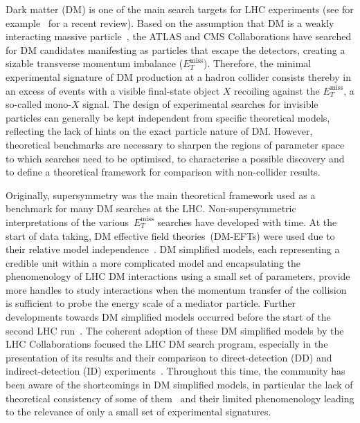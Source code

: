 \documentclass[a4paper, 11pt,notoc]{article}
\newcommand{\MET}{\ensuremath{E_T^\mathrm{miss}}\xspace}
\begin{document}
Dark matter (DM) is one of the main search targets for LHC experiments (see for example~\cite{Kahlhoefer:2017dnp} for a recent review). Based on the assumption that DM is a weakly interacting massive particle~\cite{Bertone:2004pz}, the ATLAS and CMS Collaborations have searched for DM candidates manifesting as particles that escape the detectors, creating a sizable transverse momentum imbalance ($\MET$). Therefore, the minimal experimental signature of DM production at a hadron collider consists thereby in an excess of events with a visible final-state object $X$ recoiling against the $\MET$, a so-called mono-$X$ signal.  The design of experimental searches for invisible particles can generally be kept independent from specific theoretical models, reflecting the lack of hints on the exact particle nature of DM. However, theoretical benchmarks are necessary to sharpen the regions of parameter space to which searches need to be optimised, to characterise a possible discovery and to define a theoretical framework for comparison with non-collider results. 

Originally, supersymmetry was the main theoretical framework used as a benchmark for many DM searches at the LHC.  Non-supersymmetric interpretations of the various~$\MET$ searches have  developed with time. At the start of data taking, DM effective field theories~(DM-EFTs)  were used due to their relative model independence~\cite{Cao:2009uw,Beltran:2010ww,Goodman:2010yf,Bai:2010hh,Goodman:2010ku,Fox:2011pm}.  DM simplified models, each representing a credible unit within a more complicated model and encapsulating the phenomenology of LHC DM interactions using a small set of parameters, provide more handles to study interactions when the momentum transfer of the collision is sufficient to probe the energy scale of a mediator particle. Further developments towards DM simplified models occurred before the start of the second LHC run~\cite{Abdallah:2015ter,Abercrombie:2015wmb}.  The coherent adoption of these DM simplified models by the LHC Collaborations focused the LHC DM search program, especially in the presentation of its results and their comparison to direct-detection (DD) and indirect-detection (ID) experiments~\cite{Boveia:2016mrp,Albert:2017onk}.  Throughout this time, the community has been aware of the shortcomings in DM simplified models, in particular the lack of theoretical consistency of some of them~\cite{Chala:2015ama,Bell:2015sza,Kahlhoefer:2015bea,Bell:2015rdw,Haisch:2016usn,Englert:2016joy,Ko:2016zxg} and their limited phenomenology leading to the relevance of only a small set of experimental signatures.  
\end{document}

